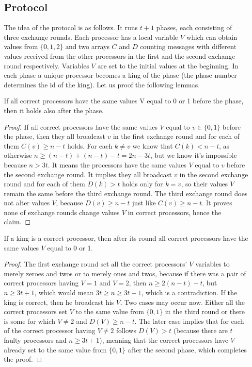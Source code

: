 \documentclass[11pt, a4paper]{report}
\begin{document}
\subsection*{Protocol}
The idea of the protocol is as follows. It runs $t+1$ phases, each consisting of three exchange rounds. Each processor has a local variable $V$ which can obtain values from $\{0,1,2\}$ and two arrays $C$ and $D$ counting messages with different values received from the other processors in the first and the second exchange round respectively. Variables $V$ are set to the initial values at the beginning. In each phase a unique processor becomes a king of the phase (the phase number determines the id of the king). Let us proof the following lemmas.
\begin{lem}
If all correct processors have the same values V equal to 0 or 1 before the phase, then it holds also after the phase.
\end{lem}
\begin{proof}
If all correct processors have the same values $V$ equal to $v\in\{0,1\}$ before the phase, then they all broadcast $v$ in the first exchange round and for each of them $C(v) \geq n-t$ holds. For each $k\neq v$ we know that $C(k) < n-t$, as otherwise $n\geq (n-t) + (n-t) - t = 2n-3t$, but we know it's impossible because $n>3t$. It means the processors have the same values $V$ equal to $v$ before the second exchange round. It implies they all broadcast $v$ in the second exchange round and for each of them $D(k)>t$ holds only for $k=v$, so their values $V$ remain the same before the third exchange round. The third exchange round does not alter values $V$, because $D(v)\geq n-t$ just like $C(v)\geq n-t$. It proves none of exchange rounds change values $V$ in correct processors, hence the claim.
\end{proof}
\begin{lem}
If a king is a correct processor, then after its round all correct processors have the same values $V$ equal to 0 or 1.
\end{lem}
\begin{proof}
The first exchange round set all the correct processors' $V$ variables to merely zeroes and twos or to merely ones and twos, because if there was a pair of correct processors having $V=1$ and $V=2$, then $n\ge2(n-t)-t$, but $n\geq 3t+1$, which would mean $3t\ge n \ge 3t+1$, which is a contradiction. If the king is correct, then he broadcast his $V$. Two cases may occur now. Either all the correct processors set $V$ to the same value from $\{0,1\}$ in the third round or there is some for which $V\neq2$ and $D(V)\ge n-t$. The later case implies that for each of the correct processor having $V\neq2$ follows $D(V)>t$ (because there are $t$ faulty processors and $n\geq 3t+1$), meaning that the correct processors have $V$ already set to the same value from $\{0,1\}$ after the second phase, which completes the proof.
\end{proof}
\end{document}
